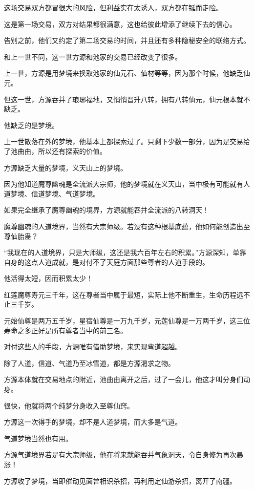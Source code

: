 \begin{this_body}
这场交易双方都冒很大的风险，但利益实在太诱人，双方都在铤而走险。

这是第一场交易，双方对结果都很满意，这也给彼此增添了继续下去的信心。

告别之前，他们又约定了第二场交易的时间，并且还有多种隐秘安全的联络方式。

和上一世不同，这一世方源和池家的交易已经改变了很多。

上一世，方源是用梦境来换取池家的仙元石、仙材等等，因为那个时候，他缺乏仙元。

但这一世，方源吞并了琅琊福地，又悄悄晋升八转，拥有八转仙元，仙元根本就不缺乏。

他缺乏的是梦境。

上一世散落在外的梦境，他基本上都探索过了。只剩下少数一部分，因为是交易给了池曲由，所以还有探索的价值。

方源缺乏大量的梦境，义天山上的梦境。

因为他知道魔尊幽魂是全流派大宗师，他的梦境就在义天山，当中极有可能就有人道梦境、信道梦境、气道梦境。

如果完全继承了魔尊幽魂的境界，方源就能吞并全流派的八转洞天！

魔尊幽魂的人道境界，当然有大宗师级。若没有这种根基底蕴，他如何能创造出至尊仙胎蛊？

“我现在的人道境界，只是大师级，这还是我六百年左右的积累。”方源深知，单靠自身的这点人道成就，是对付不了天庭方面那些尊者的人道手段的。

他活得太短，因而积累太少！

红莲魔尊寿元三千年，这在尊者当中属于最短，实际上他不断重生，生命历程远不止三千岁。

元始仙尊是两万五千岁，星宿仙尊是一万九千岁，元莲仙尊是一万两千岁，这三位寿命之多正好是所有尊者当中的前三名。

对付这些人的手段，方源唯有借助梦境，来实现弯道超越。

除了人道，信道、气道乃至冰雪道，都是方源渴求之物。

方源本体就在交易地点的附近，池曲由离开之后，过了一会儿，他这才叫分身们动身。

很快，他就将两个纯梦分身收入至尊仙窍。

方源这一次得手的梦境，却不是人道梦境，而大多是气道。

气道梦境当然也有用。

方源气道境界若是有大宗师级，他在将来就能吞并气象洞天，令自身修为再次暴涨！

方源收了梦境，当即催动见面曾相识杀招，再利用定仙游杀招，离开了南疆。


\end{this_body}
